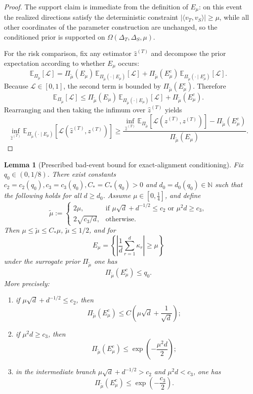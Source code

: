 \documentclass[10pt]{article}
\newtheorem{lemma}{Lemma}
\newcommand{\Ebb}{\mathbb E}
\newcommand{\ip}[2]{\langle #1,#2\rangle}
\newcommand{\wh}{\widehat}
\newcommand{\calL}{\mathcal L}
\newcommand{\trg}{T}
\newcommand{\ztar}{z^{(\trg)}}
\newcommand{\hatztar}{\wh{z}^{(\trg)}}
\newcommand{\DeltaT}{\Delta_{\trg}}
\newcommand{\src}{S}
\newcommand{\DeltaS}{\Delta_{\src}}
\begin{document}
\begin{proof}
The support claim is immediate from the definition of $E_\mu$: on this event
the realized directions satisfy the deterministic constraint
$|\ip{v_{\trg}}{v_{\src}}|\ge\mu$, while all other coordinates of the parameter
construction are unchanged, so the conditioned prior is supported on
$\Omega(\DeltaT,\DeltaS,\mu)$.

For the risk comparison, fix any estimator $\hatztar$ and decompose the prior
expectation according to whether $E_\mu$ occurs:
\[
    \Ebb_{\Pi_{\tilde\mu}}[\calL]
    =
    \Pi_{\tilde\mu}(E_\mu)\,
    \Ebb_{\Pi_{\tilde\mu}(\cdot\mid E_\mu)}[\calL]
    +
    \Pi_{\tilde\mu}(E_\mu^c)\,
    \Ebb_{\Pi_{\tilde\mu}(\cdot\mid E_\mu^c)}[\calL].
\]
Because $\calL\in[0,1]$, the second term is bounded by
$\Pi_{\tilde\mu}(E_\mu^c)$. Therefore
\[
    \Ebb_{\Pi_{\tilde\mu}}[\calL]
    \le
    \Pi_{\tilde\mu}(E_\mu)\,
    \Ebb_{\Pi_{\tilde\mu}(\cdot\mid E_\mu)}[\calL]
    +
    \Pi_{\tilde\mu}(E_\mu^c).
\]
Rearranging and then taking the infimum over $\hatztar$ yields
\[
    \inf_{\hatztar}\Ebb_{\Pi_{\tilde\mu}(\cdot\mid E_\mu)}[\calL(\hatztar,\ztar)]
    \ge
    \frac{
        \inf_{\hatztar}\Ebb_{\Pi_{\tilde\mu}}[\calL(\hatztar,\ztar)]
        -
        \Pi_{\tilde\mu}(E_\mu^c)
    }{
        \Pi_{\tilde\mu}(E_\mu)
    }.
\]
\end{proof}

\begin{lemma}[Prescribed bad-event bound for exact-alignment conditioning]
\label{lem:sec3_conditioning_bad_event}
Fix $q_0\in(0,1/8)$. There exist constants
$c_2=c_2(q_0),c_3=c_3(q_0),C_*=C_*(q_0)>0$ and
$d_0=d_0(q_0)\in\mathbb N$ such that the following holds for all
$d\ge d_0$. Assume $\mu\in[0,\tfrac14]$, and define
\[
    \tilde\mu
    :=
    \begin{cases}
        2\mu, & \text{if }\mu\sqrt d+d^{-1/2}\le c_2
        \text{ or }\mu^2 d\ge c_3,\\[4pt]
        2\sqrt{c_3/d}, & \text{otherwise.}
    \end{cases}
\]
Then $\mu\le\tilde\mu\le C_*\mu$, $\tilde\mu\le1/2$, and for
\[
    E_\mu
    =
    \left\{\left|\frac{1}{d}\sum_{r=1}^d \kappa_r\right|\ge\mu\right\}
\]
under the surrogate prior $\Pi_{\tilde\mu}$ one has
\[
    \Pi_{\tilde\mu}(E_\mu^c)\le q_0.
\]
More precisely:
\begin{enumerate}[label=\emph{(\alph*)}]
    \item if $\mu\sqrt d+d^{-1/2}\le c_2$, then
    \[
        \Pi_{\tilde\mu}(E_\mu^c)
        \le
        C\!\left(\mu\sqrt d+\frac{1}{\sqrt d}\right);
    \]
    \item if $\mu^2 d\ge c_3$, then
    \[
        \Pi_{\tilde\mu}(E_\mu^c)
        \le
        \exp\!\left(-\frac{\mu^2 d}{2}\right);
    \]
    \item in the intermediate branch
    $\mu\sqrt d+d^{-1/2}>c_2$ and $\mu^2 d<c_3$, one has
    \[
        \Pi_{\tilde\mu}(E_\mu^c)
        \le
        \exp\!\left(-\frac{c_3}{2}\right).
    \]
\end{enumerate}
\end{lemma}
\end{document}
